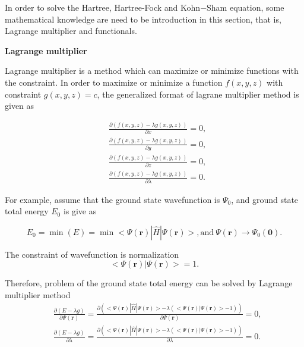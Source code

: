 \documentclass[a4paper, 12pt, titlepage,oneside,drop]{kthesis}
\begin{document}
In order to solve the Hartree, Hartree-Fock and Kohn$-$Sham equation, some mathematical knowledge are need to be introduction in this section, that is, Lagrange multiplier and functionals.

\textbf{Lagrange multiplier}

Lagrange multiplier is a method which can maximize or minimize functions with the constraint. In order to maximize or minimize a function $f(x,y,z)$ with constraint $g(x,y,z) = c$,  the generalized format of lagrane multiplier
method is given as

\begin{equation}
\begin{split}
& \frac{\partial \left( f(x,y,z) - \lambda g(x,y,z)\right)}{\partial x}=0, \\
& \frac{\partial \left( f(x,y,z) - \lambda g(x,y,z)\right)}{\partial y}=0, \\
& \frac{\partial \left( f(x,y,z) - \lambda g(x,y,z)\right)}{\partial z}=0, \\
& \frac{\partial \left( f(x,y,z) - \lambda g(x,y,z)\right)}{\partial \lambda}=0.
\end{split}
\end{equation}


For example, assume that the ground state wavefunction is $\Psi_0$, and ground state total energy $E_0$ is give as

\begin{equation}
 E_0 = \min(E) = \min<\Psi (\textbf{r}) | \widehat{H} | \Psi (\textbf{r})>, \mathrm{and} \  \Psi(\textbf{r}) \longrightarrow \Psi_0(\textbf{0}).
\end{equation}

The constraint of wavefunction is normalization
\begin{equation}
 <\Psi(\textbf{r}) |  \Psi(\textbf{r})> = 1.
\end{equation}

Therefore, problem of the ground state total energy can be solved by Lagrange multiplier method
\begin{equation}\label{lagmul}
\begin{split}
&  \frac{\partial \left( E - \lambda g \right)}{\partial \Psi(\textbf{r})} = \frac{\partial \left( <\Psi (\textbf{r}) | \widehat{H} | \Psi (\textbf{r})> - \lambda (<\Psi(\textbf{r})|\Psi(\textbf{r})>-1) \right)}{\partial \Psi(\textbf{r})} = 0, \\
&  \frac{\partial \left( E - \lambda g \right)}{\partial \lambda} = \frac{\partial \left( <\Psi (\textbf{r}) | \widehat{H} | \Psi (\textbf{r})> - \lambda (<\Psi(\textbf{r})|\Psi(\textbf{r})>-1) \right)}{\partial \lambda} = 0.
\end{split}
\end{equation}
\end{document}
